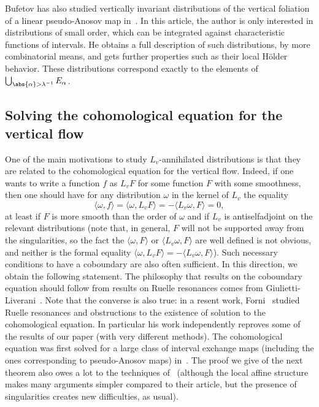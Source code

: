 \documentclass[11pt, a4paper, oneside, final, pagebackref]{amsart}
\theoremstyle{definition}
\numberwithin{equation}{section}
\begin{document}
Bufetov has also studied vertically invariant distributions of the vertical
foliation of a linear pseudo-Anosov map in~\cite{bufetov_pseudo_anosov}. In
this article, the author is only interested in distributions of small order,
which can be integrated against characteristic functions of intervals. He
obtains a full description of such distributions, by more combinatorial
means, and gets further properties such as their local H\"older behavior. These
distributions correspond exactly to the elements of
$\bigcup_{\abs{\alpha}>\lambda^{-1}} E_\alpha$.

\subsection*{Solving the cohomological equation for the vertical flow}

One of the main motivations to study $L_v$-annihilated distributions is that
they are related to the cohomological equation for the vertical flow. Indeed,
if one wants to write a function $f$ as $L_v F$ for some function $F$ with
some smoothness, then one should have for any distribution $\omega$ in the
kernel of $L_v$ the equality
\begin{equation}
\label{eq:woixcuyvjklmlsw<cmviw}
  \langle \omega, f \rangle = \langle \omega, L_v F \rangle
  = -\langle L_v \omega, F\rangle
  = 0,
\end{equation}
at least if $F$ is more smooth than the order of $\omega$ and if $L_v$ is
antiselfadjoint on the relevant distributions (note that, in general, $F$
will not be supported away from the singularities, so the fact the $\langle
\omega, F\rangle$ or $\langle L_v \omega, F\rangle$ are well defined is not
obvious, and neither is the formal equality $\langle \omega, L_v F \rangle
  = -\langle L_v \omega, F\rangle$). Such necessary conditions to
have a coboundary are also often sufficient. In this direction, we obtain the
following statement. The philosophy that results on the coboundary equation
should follow from results on Ruelle resonances comes from
Giulietti-Liverani~\cite{giulietti_liverani}. Note that the converse is also
true: in a resent work, Forni~\cite{forni2018} studied Ruelle resonances and
obstructions to the existence of solution to the cohomological equation. In
particular his work independently reproves some of the results of our paper
(with very different methods). The cohomological equation was first solved
for a large class of interval exchange maps (including the ones corresponding
to pseudo-Anosov maps) in~\cite{marmi_moussa_yoccoz}. The proof we give of
the next theorem also owes a lot to the techniques
of~\cite{giulietti_liverani} (although the local affine structure makes many
arguments simpler compared to their article, but the presence of
singularities creates new difficulties, as usual).
\end{document}
